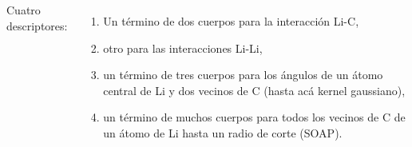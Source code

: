 \documentclass[aspectratio=169]{beamer}
\begin{document}
\begin{frame}
\begin{columns}
            Cuatro descriptores:
            \begin{enumerate}
                \item Un término de dos cuerpos para la interacción Li-C, 
                \item otro para las interacciones Li-Li,
                \item un término de tres cuerpos para los ángulos de un átomo 
                    central de Li y dos vecinos de C (hasta acá kernel gaussiano),
                \item un término de muchos cuerpos para todos los vecinos de C
                    de un átomo de Li hasta un radio de corte (SOAP).
            \end{enumerate}
        \end{columns}

    \end{frame}
    
\end{document}
